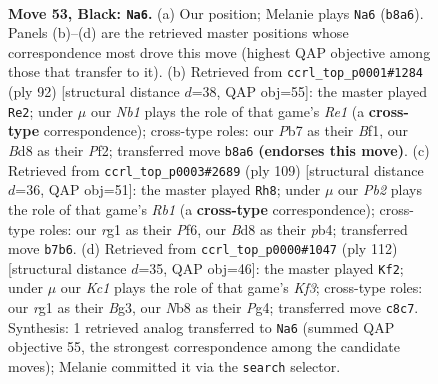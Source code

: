 \documentclass[11pt]{article}
\begin{document}
\clearpage

\begin{figure}[p]\centering
\begin{subfigure}{0.46\textwidth}\centering
\resizebox{\linewidth}{!}{%
\newchessgame
\chessboard[
  setfen={1nkb4/1p5p/6pP/p4p2/5N2/r5PK/3R4/6R1 b - - 3 53},
  showmover=false,
  pgfstyle=straightmove, color=movearrow, markmove={b8-a6}
]}
\caption{}
\end{subfigure}\hfill
\begin{subfigure}{0.46\textwidth}\centering
\resizebox{\linewidth}{!}{%
\newchessgame
\chessboard[
  setfen={7k/3nNp1p/6p1/8/4nP2/4P2P/3r1PK1/4RB2 w - - 2 47},
  showmover=false,
  pgfstyle=straightmove, color=movearrow, markmove={e1-e2}
]}
\caption{}
\end{subfigure}
\\[4pt]
\begin{subfigure}{0.46\textwidth}\centering
\resizebox{\linewidth}{!}{%
\newchessgame
\chessboard[
  setfen={1r6/3kp1RP/3p1p2/1p6/pP1N4/7P/P2b1K2/8 b - - 0 55},
  showmover=false,
  pgfstyle=straightmove, color=movearrow, markmove={b8-h8}
]}
\caption{}
\end{subfigure}\hfill
\begin{subfigure}{0.46\textwidth}\centering
\resizebox{\linewidth}{!}{%
\newchessgame
\chessboard[
  setfen={5k2/R5p1/4np2/3p4/3P2PP/1r2PKB1/8/8 w - - 13 57},
  showmover=false,
  pgfstyle=straightmove, color=movearrow, markmove={f3-f2}
]}
\caption{}
\end{subfigure}
\caption{\textbf{Move 53, Black: \texttt{Na6}.} (a) Our position; Melanie plays \texttt{Na6} (\texttt{b8a6}). Panels (b)--(d) are the retrieved master positions whose correspondence most drove this move (highest QAP objective among those that transfer to it). (b) Retrieved from \texttt{ccrl\_top\_p0001\#1284} (ply 92) [structural distance $d$=38, QAP obj=55]: the master played \texttt{Re2}; under $\mu$ our \emph{Nb1} plays the role of that game's \emph{Re1} (a \textbf{cross-type} correspondence); cross-type roles: our \emph{P}b7 as their \emph{B}f1, our \emph{B}d8 as their \emph{P}f2; transferred move \texttt{b8a6} \textbf{(endorses this move)}. (c) Retrieved from \texttt{ccrl\_top\_p0003\#2689} (ply 109) [structural distance $d$=36, QAP obj=51]: the master played \texttt{Rh8}; under $\mu$ our \emph{Pb2} plays the role of that game's \emph{Rb1} (a \textbf{cross-type} correspondence); cross-type roles: our \emph{r}g1 as their \emph{P}f6, our \emph{B}d8 as their \emph{p}b4; transferred move \texttt{b7b6}. (d) Retrieved from \texttt{ccrl\_top\_p0000\#1047} (ply 112) [structural distance $d$=35, QAP obj=46]: the master played \texttt{Kf2}; under $\mu$ our \emph{Kc1} plays the role of that game's \emph{Kf3}; cross-type roles: our \emph{r}g1 as their \emph{B}g3, our \emph{N}b8 as their \emph{P}g4; transferred move \texttt{c8c7}. Synthesis: 1 retrieved analog transferred to \texttt{Na6} (summed QAP objective 55, the strongest correspondence among the candidate moves); Melanie committed it via the \texttt{search} selector.}
\label{fig:thought-m105}
\end{figure}
\end{document}

